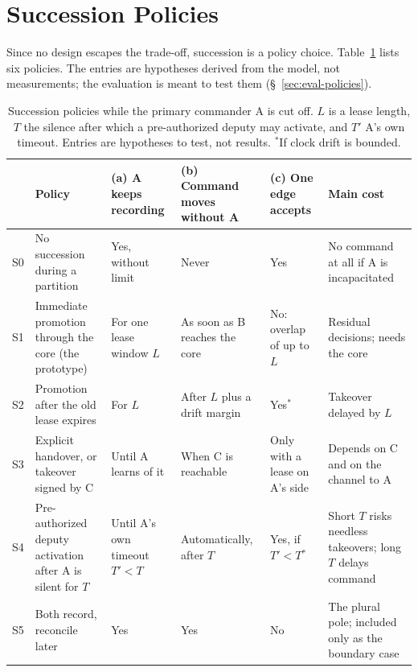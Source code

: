 \section{Succession Policies}
\label{sec:policies}

Since no design escapes the trade-off, succession is a policy choice.
Table~\ref{tab:policies} lists six policies. The entries are hypotheses derived from the
model, not measurements; the evaluation is meant to test them (\S~\ref{sec:eval-policies}).

\begin{table}[t]
\centering
\caption{Succession policies while the primary commander A is cut off. $L$ is a lease
length, $T$ the silence after which a pre-authorized deputy may activate, and $T'$ A's own
timeout. Entries are hypotheses to test, not results.
$^\ast$If clock drift is bounded.}
\label{tab:policies}
\scriptsize
\setlength{\tabcolsep}{3pt}
\begin{tabularx}{\textwidth}{@{}>{\raggedright\arraybackslash}p{}>{\raggedright\arraybackslash}p{}>{\raggedright\arraybackslash}p{}>{\raggedright\arraybackslash}p{}>{\raggedright\arraybackslash}p{}>{\raggedright\arraybackslash}X@{}}
\toprule
& \textbf{Policy} & \textbf{(a) A keeps recording} & \textbf{(b) Command moves without A} & \textbf{(c) One edge accepts} & \textbf{Main cost} \\
\midrule
S0 & No succession during a partition & Yes, without limit & Never & Yes & No command at all if A is incapacitated \\
\addlinespace
S1 & Immediate promotion through the core (the \systemname{} prototype) & For one lease window $L$ & As soon as B reaches the core & No: overlap of up to $L$ & Residual decisions; needs the core \\
\addlinespace
S2 & Promotion after the old lease expires & For $L$ & After $L$ plus a drift margin & Yes$^\ast$ & Takeover delayed by $L$ \\
\addlinespace
S3 & Explicit handover, or takeover signed by C & Until A learns of it & When C is reachable & Only with a lease on A's side & Depends on C and on the channel to A \\
\addlinespace
S4 & Pre-authorized deputy activation after A is silent for $T$ & Until A's own timeout $T' < T$ & Automatically, after $T$ & Yes, if $T' < T$$^\ast$ & Short $T$ risks needless takeovers; long $T$ delays command \\
\addlinespace
S5 & Both record, reconcile later & Yes & Yes & No & The plural pole; included only as the boundary case \\
\bottomrule
\end{tabularx}
\end{table}

